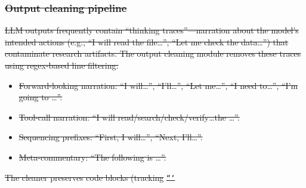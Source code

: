 \documentclass[10pt,letterpaper]{article}
\providecommand{\DIFdeltex}[1]{{\protect\color{red}\sout{#1}}}                      %
\providecommand{\DIFdelbegin}{} %
\providecommand{\DIFdel}[1]{\texorpdfstring{\DIFdeltex{#1}}{}} %
\newcommand{\DIFscaledelfig}{0.5}
\newlength{\DIFdelgraphicswidth} %
\newlength{\DIFdelgraphicsheight} %
\newcommand{\DIFdelincludegraphics}[2][]{%
\sbox{\DIFdelgraphicsbox}{\DIFOincludegraphics[#1]{#2}}%
\settoboxwidth{\DIFdelgraphicswidth}{\DIFdelgraphicsbox} %
\settoboxtotalheight{\DIFdelgraphicsheight}{\DIFdelgraphicsbox} %
\scalebox{\DIFscaledelfig}{%
\parbox[b]{\DIFdelgraphicswidth}{\usebox{\DIFdelgraphicsbox}\\[-\baselineskip] \rule{\DIFdelgraphicswidth}{0em}}\llap{\resizebox{\DIFdelgraphicswidth}{\DIFdelgraphicsheight}{%
\setlength{\unitlength}{\DIFdelgraphicswidth}%
\begin{picture}(1,1)%
\thicklines\linethickness{2pt} %
{\color[rgb]{1,0,0}\put(0,0){\framebox(1,1){}}}%
{\color[rgb]{1,0,0}\put(0,0){\line( 1,1){1}}}%
{\color[rgb]{1,0,0}\put(0,1){\line(1,-1){1}}}%
\end{picture}%
}\hspace*{3pt}}} %
} %
\DeclareRobustCommand{\DIFdelbegin}{\DIFOdelbegin \let\includegraphics\DIFdelincludegraphics} %
\begin{document}
\DIFdelbegin \subsubsection*{\DIFdel{Output cleaning pipeline}}
\DIFdel{LLM outputs frequently contain ``thinking traces''---narration about the model's intended actions (e.g., ``I will read the file\ldots'', ``Let me check the data\ldots'') that contaminate research artifacts. The output cleaning module removes these traces using regex-based line filtering:
}%
\begin{itemize}%
\item%
\DIFdel{Forward-looking narration: ``I will\ldots'', ``I'll\ldots'', ``Let me\ldots'', ``I need to\ldots'', ``I'm going to \ldots''. }%
\item%
\DIFdel{Tool-call narration: ``I will read/search/check/verify\ldots the \ldots''.
  }%
\item%
\DIFdel{Sequencing prefixes: ``First, I will\ldots'', ``Next, I'll\ldots''. }%
\item%
\DIFdel{Meta-commentary: ``The following is \ldots''. }
\end{itemize}%
\DIFdel{The cleaner preserves code blocks (tracking }\texttt{\DIFdel{```}} %
\end{document}
